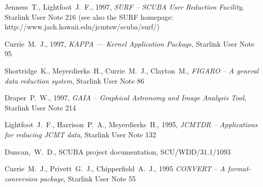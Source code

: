 \documentclass[twoside,11pt]{article}
\newcommand{\htmladdnormallink}[2]{#1}
\newcommand{\xref}[3]{#1}
\renewcommand{\_}{\texttt{\symbol{95}}}
\begin{document}
\clearpage
\begin{thebibliography}{}

Jenness~T., Lightfoot~J.~F., 1997, \textit{SURF -- SCUBA User Reduction Facility},
\xref{Starlink User Note 216}{sun216}{} (see also the SURF homepage:
\htmladdnormallink{http://www.jach.hawaii.edu/jcmt\_sw/scuba/surf/}{http://www.jach.hawaii.edu/jcmt_sw/scuba/surf/})

Currie~M.~J., 1997, {\it KAPPA --- Kernel Application Package},
\xref{Starlink User Note 95}{sun95}{}

Shortridge~K., Meyerdierks~H., Currie~M.~J., Clayton~M., 
{\it FIGARO -- A general data reduction system}, 
\xref{Starlink User Note 86}{sun86}{}

Draper~P.~W., 1997, {\it GAIA -- Graphical Astronomy and Image Analysis Tool},
\xref{Starlink User Note 214}{sun214}{}


Lightfoot~J.~F., Harrison~P.~A., Meyerdierks~H., 1995, \textit{JCMTDR --
Applications for reducing JCMT data}, \xref{Starlink User Note 132}{sun132}{}


Duncan,~W.~D., SCUBA project documentation, SCU/WDD/31.1/1093


Currie~M.~J., Privett~G.~J., Chipperfield~A.~J., 1995 {\it CONVERT --
A format-conversion package}, \xref{Starlink User Note 55}{sun55}{}



\end{thebibliography}
 
\end{document}
